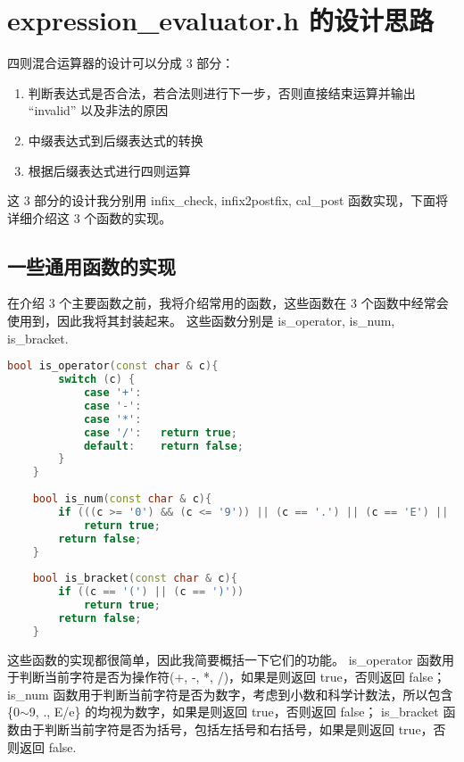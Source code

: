 \documentclass[UTF8]{ctexart}
\begin{document}
\pagestyle{fancy}
\fancyhead{}

\section{expression\_evaluator.h 的设计思路}
四则混合运算器的设计可以分成 3 部分：
\begin{enumerate}[(1)]
    \item 判断表达式是否合法，若合法则进行下一步，否则直接结束运算并输出 “invalid” 以及非法的原因
    \item 中缀表达式到后缀表达式的转换
    \item 根据后缀表达式进行四则运算
\end{enumerate}

这 3 部分的设计我分别用 infix\_check, infix2postfix, cal\_post 函数实现，下面将详细介绍这 3 个函数的实现。

\subsection{一些通用函数的实现}
在介绍 3 个主要函数之前，我将介绍常用的函数，这些函数在 3 个函数中经常会使用到，因此我将其封装起来。
这些函数分别是 is\_operator, is\_num, is\_bracket. 
\begin{lstlisting}[language=c++, breaklines=true, keywordstyle=\color{blue!70}, commentstyle=\color{red!50!green!50!blue!50}, frame=shadowbox, rulesepcolor=\color{red!20!green!20!blue!20}]
    bool is_operator(const char & c){
        switch (c) {
            case '+':
            case '-':
            case '*':
            case '/':   return true; 
            default:    return false; 
        }
    }
    
    bool is_num(const char & c){
        if (((c >= '0') && (c <= '9')) || (c == '.') || (c == 'E') || (c == 'e'))
            return true; 
        return false; 
    }
    
    bool is_bracket(const char & c){
        if ((c == '(') || (c == ')'))
            return true; 
        return false;
    }
\end{lstlisting}

这些函数的实现都很简单，因此我简要概括一下它们的功能。
is\_operator 函数用于判断当前字符是否为操作符(+, -, *, /)，如果是则返回 true，否则返回 false；
is\_num 函数用于判断当前字符是否为数字，考虑到小数和科学计数法，所以包含 \{0$\sim$9, ., E/e\} 的均视为数字，如果是则返回 true，否则返回 false；
is\_bracket 函数由于判断当前字符是否为括号，包括左括号和右括号，如果是则返回 true，否则返回 false. 
\end{document}
